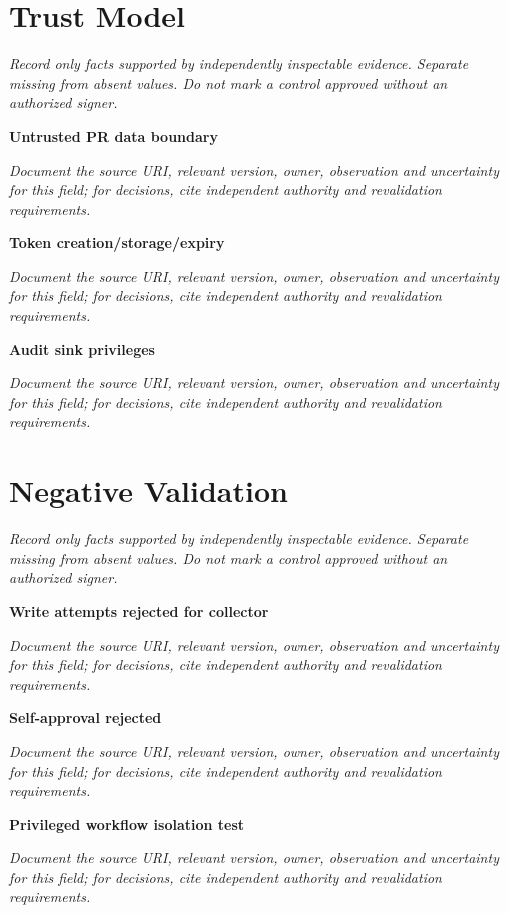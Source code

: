 \documentclass[11pt,letterpaper]{article}
\begin{document}
\section{Trust Model}
\noindent\emph{Record only facts supported by independently inspectable evidence. Separate missing from absent values. Do not mark a control approved without an authorized signer.}\par
\noindent\textbf{Untrusted PR data boundary}\par
\noindent\emph{Document the source URI, relevant version, owner, observation and uncertainty for this field; for decisions, cite independent authority and revalidation requirements.}\par\medskip
\noindent\textbf{Token creation/storage/expiry}\par
\noindent\emph{Document the source URI, relevant version, owner, observation and uncertainty for this field; for decisions, cite independent authority and revalidation requirements.}\par\medskip
\noindent\textbf{Audit sink privileges}\par
\noindent\emph{Document the source URI, relevant version, owner, observation and uncertainty for this field; for decisions, cite independent authority and revalidation requirements.}\par\medskip
\section{Negative Validation}
\noindent\emph{Record only facts supported by independently inspectable evidence. Separate missing from absent values. Do not mark a control approved without an authorized signer.}\par
\noindent\textbf{Write attempts rejected for collector}\par
\noindent\emph{Document the source URI, relevant version, owner, observation and uncertainty for this field; for decisions, cite independent authority and revalidation requirements.}\par\medskip
\noindent\textbf{Self-approval rejected}\par
\noindent\emph{Document the source URI, relevant version, owner, observation and uncertainty for this field; for decisions, cite independent authority and revalidation requirements.}\par\medskip
\noindent\textbf{Privileged workflow isolation test}\par
\noindent\emph{Document the source URI, relevant version, owner, observation and uncertainty for this field; for decisions, cite independent authority and revalidation requirements.}\par\medskip
\end{document}
